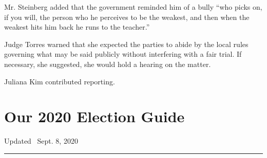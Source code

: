 Mr. Steinberg added that the government reminded him of a bully ``who
picks on, if you will, the person who he perceives to be the weakest,
and then when the weakest hits him back he runs to the teacher.''

Judge Torres warned that she expected the parties to abide by the local
rules governing what may be said publicly without interfering with a
fair trial. If necessary, she suggested, she would hold a hearing on the
matter.

Juliana Kim contributed reporting.

\hypertarget{our-2020-election-guide}{%
\section{Our 2020 Election Guide}\label{our-2020-election-guide}}

Updated ~Sept. 8, 2020

\begin{center}\rule{0.5\linewidth}{\linethickness}\end{center}

